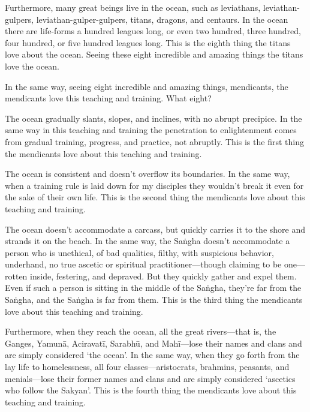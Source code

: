 \documentclass[12pt,openany]{book}%
\begin{document}
Furthermore, many great beings live in the ocean, such as leviathans, leviathan-gulpers, leviathan-gulper-gulpers, titans, dragons, and centaurs. In the ocean there are life-forms a hundred leagues long, or even two hundred, three hundred, four hundred, or five hundred leagues long. This is the eighth thing the titans love about the ocean. Seeing these eight incredible and amazing things the titans love the ocean. 

In the same way, seeing eight incredible and amazing things, mendicants, the mendicants love this teaching and training. What eight? 

The ocean gradually slants, slopes, and inclines, with no abrupt precipice. In the same way in this teaching and training the penetration to enlightenment comes from gradual training, progress, and practice, not abruptly. This is the first thing the mendicants love about this teaching and training. 

The ocean is consistent and doesn’t overflow its boundaries. In the same way, when a training rule is laid down for my disciples they wouldn’t break it even for the sake of their own life. This is the second thing the mendicants love about this teaching and training. 

The ocean doesn’t accommodate a carcass, but quickly carries it to the shore and strands it on the beach. In the same way, the \textsanskrit{Saṅgha} doesn’t accommodate a person who is unethical, of bad qualities, filthy, with suspicious behavior, underhand, no true ascetic or spiritual practitioner—though claiming to be one—rotten inside, festering, and depraved. But they quickly gather and expel them. Even if such a person is sitting in the middle of the \textsanskrit{Saṅgha}, they’re far from the \textsanskrit{Saṅgha}, and the \textsanskrit{Saṅgha} is far from them. This is the third thing the mendicants love about this teaching and training. 

Furthermore, when they reach the ocean, all the great rivers—that is, the Ganges, \textsanskrit{Yamunā}, \textsanskrit{Aciravatī}, \textsanskrit{Sarabhū}, and \textsanskrit{Mahī}—lose their names and clans and are simply considered ‘the ocean’. In the same way, when they go forth from the lay life to homelessness, all four classes—aristocrats, brahmins, peasants, and menials—lose their former names and clans and are simply considered ‘ascetics who follow the Sakyan’. This is the fourth thing the mendicants love about this teaching and training. 
\end{document}
